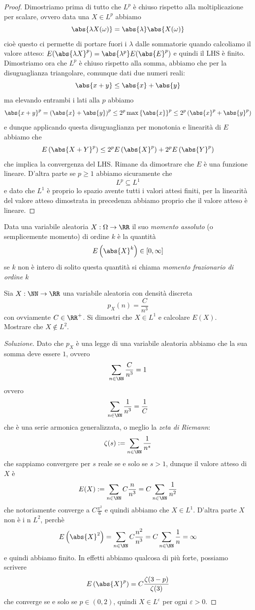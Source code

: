 \documentclass[11pt]{scrartcl}
\begin{document}
	\begin{proof}
		Dimostriamo prima di tutto che $L^p$ è chiuso rispetto alla moltiplicazione per scalare, ovvero data una $X\in L^p$ abbiamo
		$$\abs{\lambda X(\omega)}=\abs{\lambda}\abs{X(\omega)}$$
		cioè questo ci permette di portare fuori i $\lambda$ dalle sommatorie quando calcoliamo il valore atteso:
		$E(\abs{\lambda X}^p)=\abs{\lambda^p}E(\abs{E}^p)$
		e quindi il LHS è finito. Dimostriamo ora che $L^p$ è chiuso rispetto alla somma, abbiamo che per la disuguaglianza triangolare, comunque dati due numeri reali:
		$$\abs{x+y}\le \abs{x}+\abs{y}$$
		ma elevando entrambi i lati alla $p$ abbiamo
		$$\abs{x+y}^p=\left(\abs{x}+\abs{y}\right)^p\le 2^p\max\left\{\abs{x}\right\}^p\le 2^p\left(\abs{x}^p+\abs{y}^p\right)$$
		e dunque applicando questa disuguaglianza per monotonia e linearità di $E$ abbiamo che
		$$E\left(\abs{X+Y}^p\right)\le 2^pE\left(\abs{X}^p\right)+2^pE\left(\abs{Y}^p\right)$$ 
		che implica la convergenza del LHS. Rimane da dimostrare che $E$ è una funzione lineare. D'altra parte se $p\ge 1$ abbiamo sicuramente che 
		$$L^p\subseteq L^1$$
		e dato che $L^1$ è proprio lo spazio avente tutti i valori attesi finiti, per la linearità del valore atteso dimostrata in precedenza abbiamo proprio che il valore atteso è lineare.
	\end{proof}
	\begin{definition}
		Data una variabile aleatoria $X:\Omega\to\RR$ il suo \textit{momento assoluto} (o semplicemente momento) di ordine $k$ è la quantità 
		$$E\left(\abs{X}^k\right)\in [0,\infty]$$
		se $k$ non è intero di solito questa quantità si chiama \textit{momento frazionario di ordine $k$}
	\end{definition}
	
	\begin{example}
		Sia $X:\NN\to\RR$ una variabile aleatoria con densità discreta
		$$p_X(n)=\frac{C}{n^3}$$
		con ovviamente $C\in\RR^+$. Si dimostri che $X\in L^1$ e calcolare $E(X)$. 	\\
		Mostrare che $X\not\in L^2$.
	\end{example}
	\begin{proof}[Soluzione]
		Dato che $p_X$ è una legge di una variabile aleatoria abbiamo che la sua somma deve essere $1$, ovvero
		$$\sum_{n\in\NN}\frac{C}{n^3}=1$$
		ovvero
		$$\sum_{n\in\NN}\frac{1}{n^3}=\frac{1}{C}$$
		che è una serie armonica generalizzata, o meglio la \textit{zeta di Riemann}:
		$$\zeta(s):=\sum_{n\in\NN}\frac{1}{n^s}$$
		che sappiamo convergere per $s$ reale se e solo se $s>1$, dunque il valore atteso di $X$ è
		$$E(X):=\sum_{n\in\NN}C\frac{n}{n^3}=C\sum_{n\in\NN}\frac{1}{n^2}$$
		che notoriamente converge a $C\frac{\pi^2}{6}$ e quindi abbiamo che $X\in L^1$. D'altra parte $X$ non è i n $L^2$, perchè
		$$E\left(\abs{X}^2\right)=\sum_{n\in\NN}C\frac{n^2}{n^3}=C\sum_{n\in\NN}\frac{1}{n}=\infty$$
		e quindi abbiamo finito. In effetti abbiamo qualcosa di più forte, possiamo scrivere
		$$E\left(\abs{X}^p\right)=C\frac{\zeta(3-p)}{\zeta(3)}$$
		che converge se e solo se $p\in (0,2)$, quindi $X\in L^\varepsilon$ per ogni $\varepsilon>0$.
	\end{proof}
\end{document}
